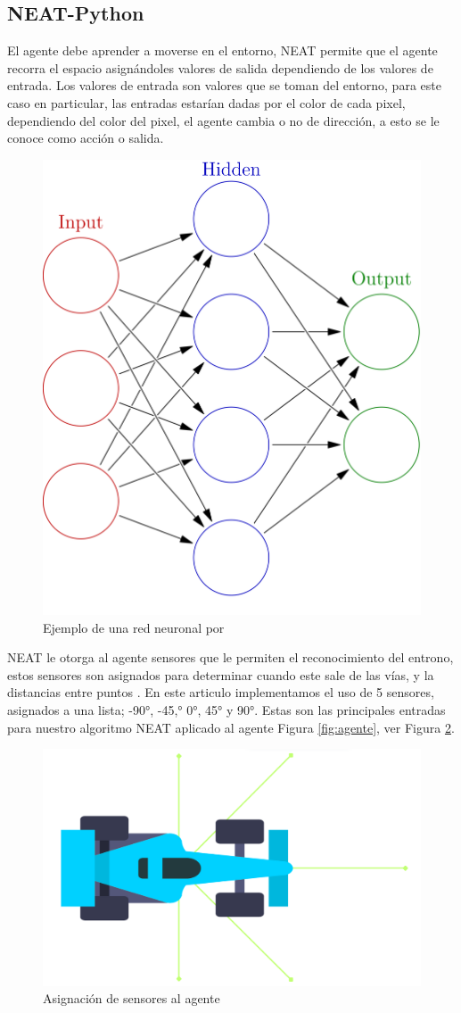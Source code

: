 \documentclass[conference]{IEEEtran}
\begin{document}
\subsection{NEAT-Python}
El agente debe aprender a moverse en el entorno, NEAT permite que el agente recorra el espacio asignándoles valores de salida dependiendo de los valores de entrada. Los valores de entrada son valores que se toman del entorno, para este caso en particular, las entradas estarían dadas por el color de cada pixel, dependiendo del color del pixel, el agente cambia o no de dirección,  a esto se le conoce como acción o salida.
\begin{figure}[H]
    \centering    \includegraphics[width=0.5\linewidth]{images/neural_network.png}
    \caption{Ejemplo de una red neuronal por \cite{red_neuronal}}
    \label{fig:Red-neuronal}
\end{figure}

NEAT le otorga al agente sensores que le permiten el reconocimiento del entrono, estos sensores son asignados para determinar cuando este sale de las vías, y la distancias entre puntos \cite{sensores}. En este articulo implementamos el uso de 5 sensores, asignados a una lista; -90°, -45,° 0°, 45° y 90°. Estas son las principales entradas para nuestro algoritmo NEAT aplicado al agente Figura \ref{fig:agente}, ver Figura \ref{fig:agente_sensores}.

\begin{figure}[H]
    \centering
    \includegraphics[width=0.8\linewidth]{images/sensores.png}
    \caption{Asignación de sensores al agente}
    \label{fig:agente_sensores}
\end{figure}
\end{document}
